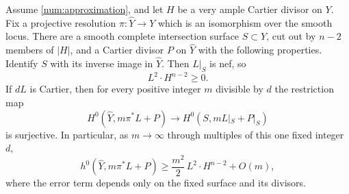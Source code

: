 \begin{lemma}\label{num:growth}
Assume \eqref{num:approximation}, and let \(H\) be a very ample Cartier
divisor on \(Y\).  Fix a projective resolution
\(\pi:\widehat Y\to Y\) which is an isomorphism over the smooth locus.
There are a smooth complete intersection surface
\(S\subset Y\), cut out by \(n-2\) members of \(|H|\), and a Cartier
divisor \(P\) on \(\widehat Y\) with the following properties.
Identify \(S\) with its inverse image in \(\widehat Y\).  Then
\(L|_S\) is nef, so
\begin{equation}\label{num:nonnegative-square}
L^2\cdot H^{n-2}\geq 0.
\end{equation}
If \(dL\) is Cartier, then for every positive integer \(m\) divisible
by \(d\) the restriction map
\begin{equation}\label{num:restriction-surjective}
H^0(\widehat Y,m\pi^*L+P)
\longrightarrow H^0(S,mL|_S+P|_S)
\end{equation}
is surjective.  In particular, as \(m\to\infty\) through multiples of
this one fixed integer \(d\),
\begin{equation}\label{num:quadratic-growth}
h^0(\widehat Y,m\pi^*L+P)
\geq \frac{m^2}{2}\,L^2\cdot H^{n-2}+O(m),
\end{equation}
where the error term depends only on the fixed surface and its divisors.
\end{lemma}


